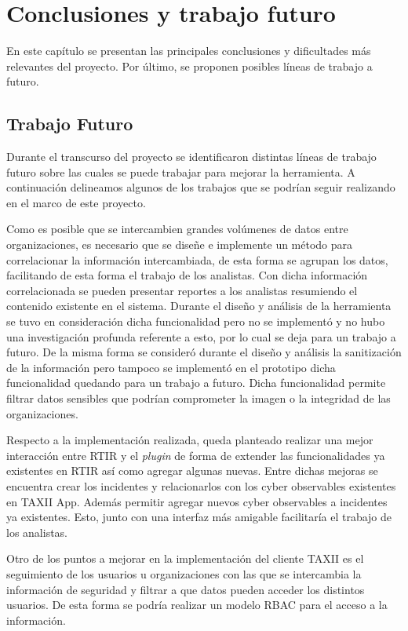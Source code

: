 \chapter{Conclusiones y trabajo futuro}
\label{capitulo7}

En este capítulo se presentan las principales conclusiones y dificultades más relevantes del proyecto. Por último, se proponen posibles líneas de trabajo a futuro.

\section{Trabajo Futuro}
Durante el transcurso del proyecto se identificaron distintas líneas de trabajo futuro sobre las cuales se puede trabajar para mejorar la herramienta. A continuación delineamos algunos de los trabajos que se podrían seguir realizando en el marco de este proyecto.
\bigskip

Como es posible que se intercambien grandes volúmenes de datos entre organizaciones, es necesario que se diseñe e implemente un método para correlacionar la información intercambiada, de esta forma se agrupan los datos, facilitando de esta forma el trabajo de los analistas. Con dicha información correlacionada se pueden presentar reportes a los analistas resumiendo el contenido existente en el sistema. Durante el diseño y análisis de la herramienta se tuvo en consideración dicha funcionalidad pero no se implementó y no hubo una investigación profunda referente a esto, por lo cual se deja para un trabajo a futuro. 
De la misma forma se consideró durante el diseño y análisis la sanitización de la información pero tampoco se implementó en el prototipo dicha funcionalidad quedando para un trabajo a futuro.  Dicha funcionalidad permite filtrar datos sensibles que podrían comprometer la imagen o la integridad de las organizaciones.
\bigskip

Respecto a la implementación realizada, queda planteado realizar una mejor interacción entre RTIR y el \textit{plugin} de forma de extender las funcionalidades ya existentes en RTIR así como agregar algunas nuevas. Entre dichas mejoras se encuentra crear los incidentes y relacionarlos con los cyber observables existentes en TAXII App. Además permitir agregar nuevos cyber observables a incidentes ya existentes. Esto, junto con una interfaz más amigable facilitaría  el trabajo de los analistas.
\bigskip

Otro de los puntos a mejorar en la implementación del cliente TAXII es el seguimiento de los usuarios u organizaciones con las que se intercambia la información de seguridad y filtrar a que datos pueden acceder los distintos usuarios. De esta forma se podría realizar un modelo RBAC para el acceso a la información.
\bigskip

